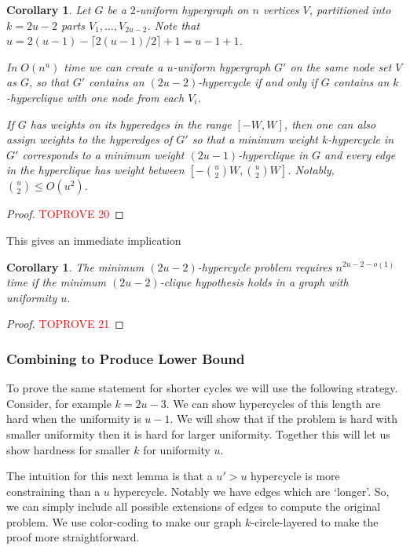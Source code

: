 \documentclass[11pt,letterpaper,pdftex]{article}
\newtheorem{corollary}[theorem]{Corollary}
\begin{document}
\begin{corollary}
    \label{cor: reverseUandKMineven}
    Let $G$ be a $2$-uniform hypergraph on $n$ vertices $V$, partitioned into $k = 2u-2$ parts $V_1,\ldots,V_{2u-2}$. Note that $u=2(u-1)-\lceil 2(u-1)/2\rceil +1 = u-1+1$.
    
    In $O(n^{u})$ time we can create a $u$-uniform hypergraph $G'$ on the same node set $V$ as $G$, so that $G'$ contains an $(2u-2)$-hypercycle if and only if $G$ contains an $k$-hyperclique with one node from each $V_i$.
    
    If $G$ has weights on its hyperedges in the range $[-W,W]$, then one can also assign weights to the hyperedges of $G'$ so that a minimum weight $k$-hypercycle in $G'$ corresponds to a minimum weight $(2u-1)$-hyperclique in $G$ and every edge in the hyperclique has weight between $[-\binom{u}{2}W,\binom{u}{2}W]$. Notably, $\binom{u}{2}\leq O(u^2)$.
\end{corollary}
\begin{proof}\textcolor{red}{TOPROVE 20}\end{proof}

This gives an immediate implication 

\begin{corollary}
The minimum $(2u-2)$-hypercycle problem requires $n^{2u-2-o(1)}$ time if the minimum $(2u-2)$-clique hypothesis holds in a graph with uniformity $u$. 
\label{cor:min2u-1ishardEven}
\end{corollary}
\begin{proof}\textcolor{red}{TOPROVE 21}\end{proof}


\subsubsection{Combining to Produce Lower Bound}
To prove the same statement for shorter cycles we will use the following strategy. Consider, for example $k = 2u-3$. We can show hypercycles of this length are hard when the uniformity is $u-1$. We will show that if the problem is hard with smaller uniformity then it is hard for larger uniformity. Together this will let us show hardness for smaller $k$ for uniformity $u$.


The intuition for this next lemma is that a $u' > u$ hypercycle is more constraining than a $u$ hypercycle. Notably we have edges which are `longer'. So, we can simply include all possible extensions of edges to compute the original problem. We use color-coding to make our graph $k$-circle-layered to make the proof more straightforward. 
\end{document}
